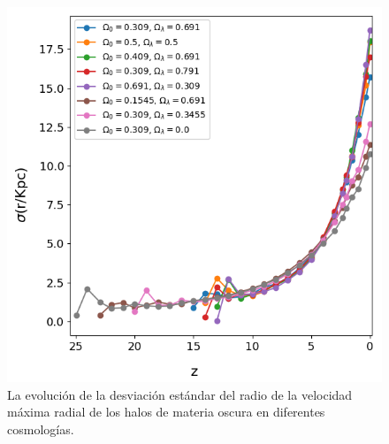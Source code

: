 \documentclass{beamer}
\begin{document}
\begin{frame}
\begin{columns}[t]
			\begin{column}{.5\textwidth}
				\begin{figure}
					\centering
					\includegraphics[scale=0.27]{Conc/VMaxRad_Std_Conc.png}
					\caption{\footnotesize La evolución de la desviación estándar del radio de la velocidad máxima radial de los halos de materia oscura en diferentes cosmologías.}
					\label{fig:Conc-VMaxRadStd}
				\end{figure}
			\end{column}
		\end{columns}

	\end{frame}	

\end{document}
